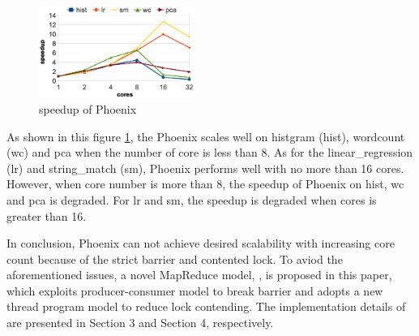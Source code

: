 
\begin{figure}[!h!t]  
	\centering
	\includegraphics[width=0.45\textwidth]{eps/phoenix_speedup.eps}
	\caption{speedup of Phoenix}
	\label{fig:phoenix:speedup}
\end{figure}

As shown in this figure \ref{fig:phoenix:speedup}, 
the Phoenix scales well on histgram (hist), wordcount (wc) and pca when the number of core is less than 8.
As for the linear\_regression (lr) and string\_match (sm), 
Phoenix performs well with no more than 16 cores.
However, when core number is more than  8, 
the speedup of Phoenix  on hist,  wc and pca is degraded.
For lr and sm, the speedup is degraded when cores is greater than 16.


In conclusion, Phoenix can not achieve desired scalability with increasing core count because of the strict barrier and contented lock.
To aviod the aforementioned issues, a novel MapReduce model, \myds,  is proposed in this paper,
which exploits producer-consumer model to break barrier
and adopts a new thread program model to reduce lock contending.
The implementation details of \myds are presented in Section 3 and Section 4, respectively.  







